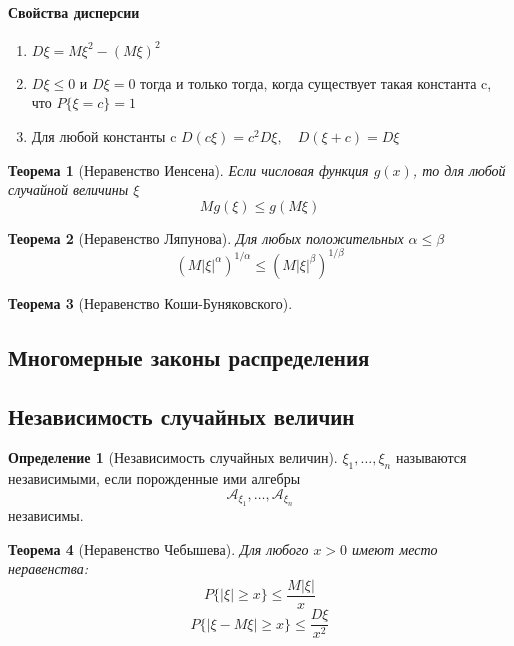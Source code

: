 \documentclass[a4paper]{article}
\newtheorem{theorem}{Теорема}[section]
\theoremstyle{definition}
\newtheorem*{definition}{Определение}
\theoremstyle{remark}
\begin{document}
\paragraph*{Свойства дисперсии}
\begin{enumerate}
    \item $D\xi = M\xi^2 - (M\xi)^2$
    \item $D\xi\leq 0$ и $D\xi = 0$ тогда и только тогда, когда существует такая константа c, что $P\{\xi = c\} = 1$
    \item Для любой константы c $D(c\xi) = c^2 D\xi, \quad D(\xi +c) = D\xi$
\end{enumerate}
\begin{theorem}[Неравенство Иенсена]
    Если числовая функция $g(x)$, то для любой случайной величины $\xi$
    \[Mg(\xi)\leq g(M\xi)\]
\end{theorem}
\begin{theorem}[Неравенство Ляпунова]
    Для любых положительных $\alpha \leq \beta$
    \[(M|\xi|^\alpha)^{1/ \alpha}\leq (M|\xi|^\beta)^{1/ \beta}\]
\end{theorem}
\begin{theorem}[Неравенство Коши-Буняковского]
    
\end{theorem}
\subsection{Многомерные законы распределения}
\subsection{Независимость случайных величин}
\begin{definition}[Независимость случайных величин]
    $\xi_1, \dots, \xi_n$ называются независимыми, если порожденные ими алгебры \[\mathcal{A}_{\xi_1}, \dots, \mathcal{A}_{\xi_n}\] независимы.
\end{definition}
\begin{theorem}[Неравенство Чебышева]
    Для любого $x>0$ имеют место неравенства:
    \[P\{|\xi|\geq x\} \leq \frac{M|\xi|}{x}\]
    \[P\{|\xi - M\xi| \geq x\} \leq \frac{D \xi}{x^2}\]
\end{theorem}
\end{document}
